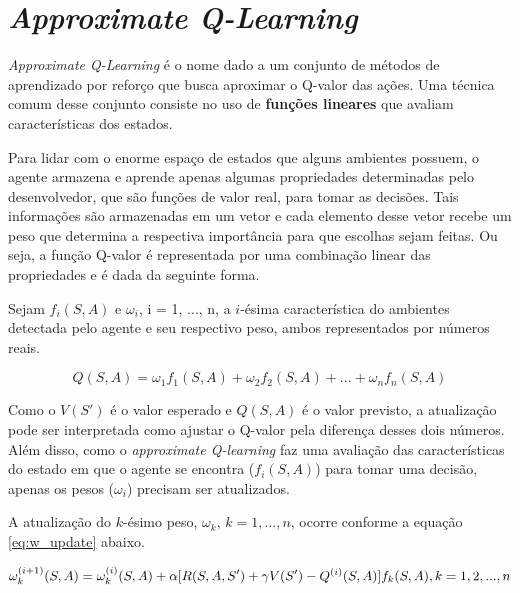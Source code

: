 
\section{\textit{Approximate Q-Learning}}
\label{sec:aql}

\textit{Approximate Q-Learning} é o nome dado a um conjunto de métodos de aprendizado por reforço que busca aproximar o Q-valor das ações.
Uma técnica comum desse conjunto consiste no uso de \textbf{funções lineares} que avaliam características dos estados.

Para lidar com o enorme espaço de estados que alguns ambientes possuem, o agente armazena e aprende apenas algumas propriedades determinadas pelo desenvolvedor, que são funções de valor real, para tomar as decisões.
Tais informações são armazenadas em um vetor e cada elemento desse vetor recebe um peso que determina a respectiva importância para que escolhas sejam feitas. Ou seja, a função Q-valor é representada por uma combinação linear das propriedades e é dada da seguinte forma.

Sejam $f_{i}(S,A)$ e $\omega_{i}$, i = 1, ..., n, a $i$-ésima característica do ambientes detectada pelo agente e seu respectivo peso, ambos representados por números reais.

\begin{equation} \label{eq:q_lin_comb}
Q(S,A) = \omega_{1}f_{1}(S,A) + \omega_{2}f_{2}(S,A) + ... + \omega_{n}f_{n}(S,A)
\end{equation}

Como o $V(S')$ é o valor esperado e $Q(S,A)$ é o valor previsto, a atualização pode ser interpretada como ajustar o Q-valor pela diferença desses dois números.
Além disso, como o \textit{approximate Q-learning} faz uma avaliação das características do estado em que o agente se encontra ($f_{i}(S,A)$) para tomar uma decisão, apenas os pesos ($\omega_{i}$) precisam ser atualizados.

A atualização do $k$-ésimo peso, $\omega_{k}$, $k = 1, ..., n$, ocorre conforme a equação \ref{eq:w_update} abaixo.

\begin{equation} \label{eq:w_update}
\omega_{k}^{(i+1)}(S,A) = \omega_{k}^{(i)}(S,A) + \alpha[R(S,A,S') + \gamma V(S') - Q^{(i)}(S,A)]f_{k}(S,A), \hfill k = 1, 2, ..., n
\end{equation}

